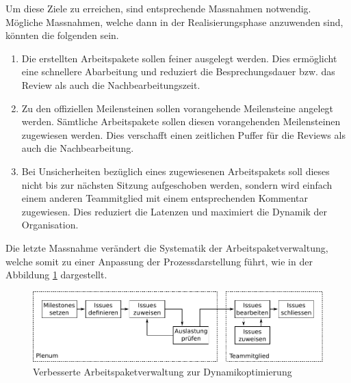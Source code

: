 \noindent
Um diese Ziele zu erreichen, sind entsprechende Massnahmen notwendig.
Mögliche Massnahmen, welche dann in der Realisierungsphase anzuwenden sind,
könnten die folgenden sein.

\begin{enumerate}
	\item Die erstellten Arbeitspakete sollen feiner ausgelegt werden.
		Dies ermöglicht eine schnellere Abarbeitung und reduziert
		die Besprechungsdauer bzw. das Review als auch die
		Nachbearbeitungszeit.
	\item Zu den offiziellen Meilensteinen sollen vorangehende
		Meilensteine angelegt werden. Sämtliche Arbeitspakete sollen
		diesen vorangehenden Meilensteinen zugewiesen werden.
		Dies verschafft einen zeitlichen Puffer für die Reviews als
		auch die Nachbearbeitung.
	\item Bei Unsicherheiten bezüglich eines zugewiesenen Arbeitspakets
		soll dieses nicht bis zur nächsten Sitzung aufgeschoben werden,
		sondern wird einfach einem anderen Teammitglied mit einem
		entsprechenden Kommentar zugewiesen. Dies reduziert die
		Latenzen und maximiert die Dynamik der Organisation.
\end{enumerate}

Die letzte Massnahme verändert die Systematik der Arbeitspaketverwaltung,
welche somit zu einer Anpassung der Prozessdarstellung führt, wie in der
Abbildung \ref{fig:pm-issue-02} dargestellt.

\begin{figure}[h!]
	\centering
	\includegraphics[scale=1]{../../fig/pm/issue_02.pdf}
	\caption{Verbesserte Arbeitspaketverwaltung zur Dynamikoptimierung}
	\label{fig:pm-issue-02}
\end{figure}
